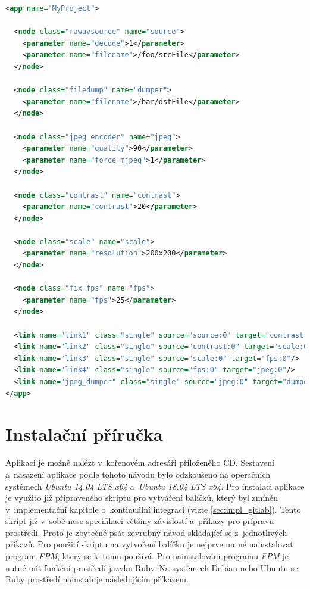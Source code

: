\documentclass[thesis=M,czech]{FITthesis}[2012/06/26]
\begin{document}
\begin{lstlisting}[language=XML]
<app name="MyProject">

  <node class="rawavsource" name="source">
	<parameter name="decode">1</parameter>
	<parameter name="filename">/foo/srcFile</parameter>
  </node>

  <node class="filedump" name="dumper">
	<parameter name="filename">/bar/dstFile</parameter>
  </node>

  <node class="jpeg_encoder" name="jpeg">
    <parameter name="quality">90</parameter>
    <parameter name="force_mjpeg">1</parameter>
  </node>

  <node class="contrast" name="contrast">
	<parameter name="contrast">20</parameter>
  </node>

  <node class="scale" name="scale">
	<parameter name="resolution">200x200</parameter>
  </node>

  <node class="fix_fps" name="fps">
	<parameter name="fps">25</parameter>
  </node>

  <link name="link1" class="single" source="source:0" target="contrast:0"/>
  <link name="link2" class="single" source="contrast:0" target="scale:0"/>
  <link name="link3" class="single" source="scale:0" target="fps:0"/>
  <link name="link4" class="single" source="fps:0" target="jpeg:0"/>
  <link name="jpeg_dumper" class="single" source="jpeg:0" target="dumper:0"/>
</app>
\end{lstlisting}

\section{Instalační příručka} \label{sec:impl_prirucka}
Aplikaci je možné nalézt v~kořenovém adresáři přiloženého CD. Sestavení a~nasazení aplikace podle tohoto návodu bylo odzkoušeno na operačních systémech \textit{Ubuntu 14.04 LTS x64} a~\textit{Ubuntu 18.04 LTS x64}. Pro instalaci aplikace je využito již připraveného skriptu pro vytváření balíčků, který byl zmíněn v~implementační kapitole o~kontinuální integraci (vizte \ref{sec:impl_gitlab}). Tento skript již v~sobě nese specifikaci většiny závislostí a~příkazy pro přípravu prostředí. Proto je zbytečné psát zevrubný návod skládající se z~jednotlivých příkazů. Pro použití skriptu na vytvoření balíčku je nejprve nutné nainstalovat program \textit{FPM}, který se k~tomu používá. Pro nainstalování programu \textit{FPM} je nutné mít funkční prostředí jazyku Ruby. Na systémech Debian nebo Ubuntu se Ruby prostředí nainstaluje následujícím příkazem.\\
\end{document}
